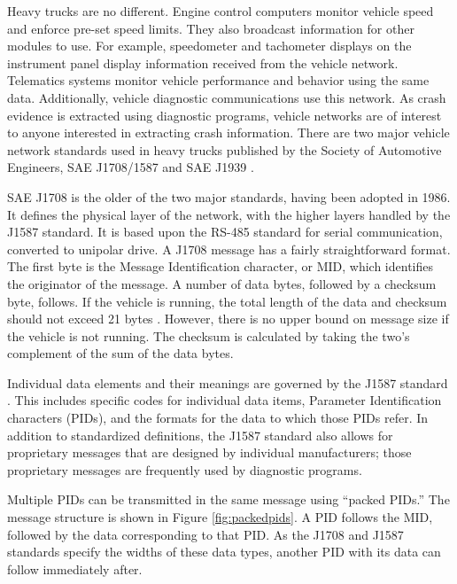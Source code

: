 Heavy trucks are no different. Engine control computers monitor vehicle speed and enforce pre-set speed limits. They also broadcast information
for other modules to use. For example, speedometer and tachometer displays on the instrument panel display information received from the vehicle
network. Telematics systems monitor vehicle performance and behavior using the same data. Additionally, vehicle diagnostic communications use
this network. As crash evidence is extracted using diagnostic programs, vehicle networks are of interest to anyone interested in extracting
crash information. There are two major vehicle network standards used in heavy trucks published by the Society of Automotive Engineers,
 SAE J1708/1587 \cite{J1708}\cite{J1587} and SAE J1939 \cite{J1939-71}.


SAE J1708 is the older of the two major standards, having been adopted in 1986. It defines the physical layer of the network,
with the higher layers handled by the J1587 standard. It is based upon the RS-485 standard for serial communication, converted to 
unipolar drive. A J1708 message has a fairly straightforward format. The first byte is the Message Identification character, or MID, which 
identifies the originator of the message. A number of data bytes, followed by a checksum byte, follows. If the vehicle is running, 
the total length of the data and checksum should not exceed 21 bytes \cite{J1708}. However, there is no upper bound on message size if the vehicle 
is not running. The checksum is calculated by taking the two's complement of the sum of the data bytes.

Individual data elements and their meanings are governed by the J1587 standard \cite{J1587}. This includes specific codes for individual data items,
Parameter Identification characters (PIDs), and the formats for the data to which those PIDs refer. In addition to standardized definitions, 
the J1587 standard also allows for proprietary messages that are designed by individual manufacturers; those proprietary messages are frequently used by 
diagnostic programs.

Multiple PIDs can be transmitted in the same message using ``packed PIDs.'' The message structure is shown in Figure \ref{fig:packedpids}. A PID follows the MID, followed by
the data corresponding to that PID. As the J1708 and J1587 standards specify the widths of these data types, another PID with its data can follow immediately
after.

